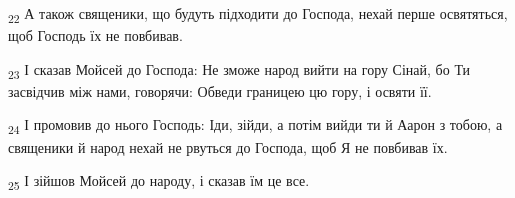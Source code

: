 \begin{tcolorbox}
\textsubscript{22} А також священики, що будуть підходити до Господа, нехай перше освятяться, щоб Господь їх не повбивав.
\end{tcolorbox}
\begin{tcolorbox}
\textsubscript{23} І сказав Мойсей до Господа: Не зможе народ вийти на гору Сінай, бо Ти засвідчив між нами, говорячи: Обведи границею цю гору, і освяти її.
\end{tcolorbox}
\begin{tcolorbox}
\textsubscript{24} І промовив до нього Господь: Іди, зійди, а потім вийди ти й Аарон з тобою, а священики й народ нехай не рвуться до Господа, щоб Я не повбивав їх.
\end{tcolorbox}
\begin{tcolorbox}
\textsubscript{25} І зійшов Мойсей до народу, і сказав їм це все.
\end{tcolorbox}
